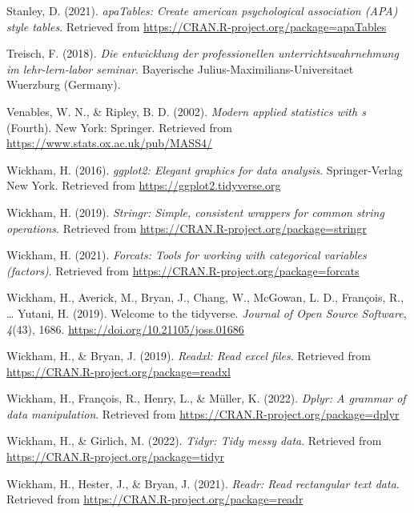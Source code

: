 \documentclass[
  man]{apa6}
\newlength{\cslhangindent}
\newenvironment{CSLReferences}[2] %
 {\begin{list}{}{%
  \setlength{\itemindent}{0pt}
  \setlength{\leftmargin}{0pt}
  \setlength{\parsep}{0pt}
  \ifodd #1
   \setlength{\leftmargin}{\cslhangindent}
   \setlength{\itemindent}{-1\cslhangindent}
  \fi
  \setlength{\itemsep}{#2\baselineskip}}}
 {\end{list}}
\begin{document}
\begin{CSLReferences}{1}{0}
Stanley, D. (2021). \emph{apaTables: Create american psychological association (APA) style tables}. Retrieved from \url{https://CRAN.R-project.org/package=apaTables}

Treisch, F. (2018). \emph{Die entwicklung der professionellen unterrichtswahrnehmung im lehr-lern-labor seminar}. Bayerische Julius-Maximilians-Universitaet Wuerzburg (Germany).

Venables, W. N., \& Ripley, B. D. (2002). \emph{Modern applied statistics with s} (Fourth). New York: Springer. Retrieved from \url{https://www.stats.ox.ac.uk/pub/MASS4/}

Wickham, H. (2016). \emph{ggplot2: Elegant graphics for data analysis}. Springer-Verlag New York. Retrieved from \url{https://ggplot2.tidyverse.org}

Wickham, H. (2019). \emph{Stringr: Simple, consistent wrappers for common string operations}. Retrieved from \url{https://CRAN.R-project.org/package=stringr}

Wickham, H. (2021). \emph{Forcats: Tools for working with categorical variables (factors)}. Retrieved from \url{https://CRAN.R-project.org/package=forcats}

Wickham, H., Averick, M., Bryan, J., Chang, W., McGowan, L. D., François, R., \ldots{} Yutani, H. (2019). Welcome to the {tidyverse}. \emph{Journal of Open Source Software}, \emph{4}(43), 1686. \url{https://doi.org/10.21105/joss.01686}

Wickham, H., \& Bryan, J. (2019). \emph{Readxl: Read excel files}. Retrieved from \url{https://CRAN.R-project.org/package=readxl}

Wickham, H., François, R., Henry, L., \& Müller, K. (2022). \emph{Dplyr: A grammar of data manipulation}. Retrieved from \url{https://CRAN.R-project.org/package=dplyr}

Wickham, H., \& Girlich, M. (2022). \emph{Tidyr: Tidy messy data}. Retrieved from \url{https://CRAN.R-project.org/package=tidyr}

Wickham, H., Hester, J., \& Bryan, J. (2021). \emph{Readr: Read rectangular text data}. Retrieved from \url{https://CRAN.R-project.org/package=readr}


\end{CSLReferences}
\end{document}
